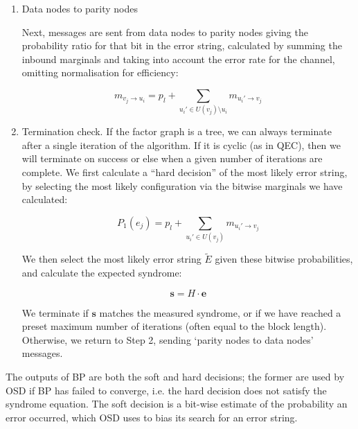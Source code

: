 \begin{enumerate}
We also include $alpha$, a scaling factor as outlined in \cite{emran2014simplified}. The scaling factor $\alpha$ is set according to the current iteration $iter$, where the first iteration is numbered $iter=1$:
		
\begin{equation}
\alpha = 1 - 2^{-iter}
\end{equation}

	
	\item Data nodes to parity nodes
	
	Next, messages are sent from data nodes to parity nodes giving the probability ratio for that bit in the error string, calculated by summing the inbound marginals and taking into account the error rate for the channel, omitting normalisation for efficiency:
	
\begin{equation}
m_{v_j \rightarrow u_i} = p_l + \sum_{u_i' \in U(v_j) \setminus u_i} m_{u_i' \to v_j}
\end{equation}


	
	\item Termination check. If the factor graph is a tree, we can always terminate after a single iteration of the algorithm. If it is cyclic (as in QEC), then we will terminate on success or else when a given number of iterations are complete. We first calculate a ``hard decision'' of the most likely error string, by selecting the most likely configuration via the bitwise marginals we have calculated:
	
\begin{equation}
P_1(e_j) = p_l + \sum_{u_i' \in U(v_j)} m_{u_i' \to v_j}
\end{equation}
	
	We then select the most likely error string $\tilde E$ given these bitwise probabilities, and calculate the expected syndrome:
	
	\begin{equation}
		\textbf{s} = H \cdot \mathbf{e}
	\end{equation}
	
	We terminate if $\mathbf{s}$ matches the measured syndrome, or if we have reached a preset maximum number of iterations (often equal to the block length). Otherwise, we return to Step 2, sending `parity nodes to data nodes' messages.
	
\end{enumerate}

The outputs of BP are both the soft and hard decisions; the former are used by OSD if BP has failed to converge, i.e. the hard decision does not satisfy the syndrome equation. The soft decision is a bit-wise estimate of the probability an error occurred, which OSD uses to bias its search for an error string.


